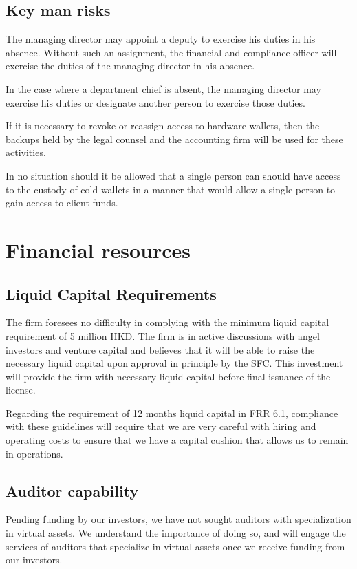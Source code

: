 \subsection{Key man risks}
The managing director may appoint a deputy to exercise his duties in
his absence.  Without such an assignment, the financial and
compliance officer will exercise the duties of the managing director
in his absence.

In the case where a department chief is absent, the managing director
may exercise his duties or designate another person to exercise those
duties.

If it is necessary to revoke or reassign access to hardware wallets,
then the backups held by the legal counsel and the accounting firm
will be used for these activities.

In no situation should it be allowed that a single person can should
have access to the custody of cold wallets in a manner that would allow a
single person to gain access to client funds.

\section{Financial resources}
\subsection{Liquid Capital Requirements}

The firm foresees no difficulty in complying with the minimum liquid
capital requirement of 5 million HKD.  The firm is in active
discussions with angel investors and venture capital and believes that
it will be able to raise the necessary liquid capital upon approval in
principle by the SFC. This investment will provide the firm with
necessary liquid capital before final issuance of the license.

Regarding the requirement of 12 months liquid capital in FRR
6.1, compliance with these guidelines will require that we are very
careful with hiring and operating costs to ensure that we
have a capital cushion that allows us to remain in operations.


\subsection{Auditor capability}
Pending funding by our investors, we have not sought auditors with
specialization in virtual assets.  We understand the importance of
doing so, and will engage the services of auditors that specialize in
virtual assets once we receive funding from our investors.

